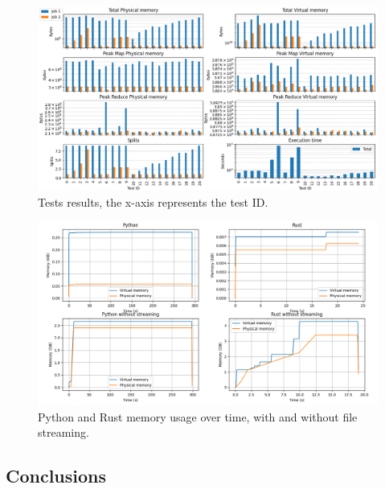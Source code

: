 \documentclass{article}
\begin{document}
\begin{figure}[H]
    \centering
    \includegraphics[width=1\textwidth]{figures/experiments.png}
    \caption{Tests results, the x-axis represents the test ID.}
    \label{fig:tests_graph}
\end{figure}
\begin{figure}[H]
    \centering
    \includegraphics[width=1\textwidth]{figures/baseline.png}
    \caption{Python and Rust memory usage over time, with and without file streaming.}
    \label{fig:baseline}
\end{figure}
\begin{multicols}{2}

\section{Conclusions}
\end{multicols}
\end{document}
